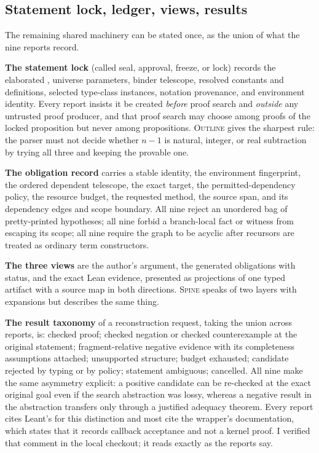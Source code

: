 \documentclass[11pt,a4paper]{article}
\newcommand{\code}[1]{\texttt{\detokenize{#1}}}
\newcommand{\Ou}{\textsc{Outline}}
\newcommand{\Sp}{\textsc{Spine}}
\theoremstyle{definition}
\begin{document}
\subsection{Statement lock, ledger, views, results}
The remaining shared machinery can be stated once, as the union of what the nine reports record.

\textbf{The statement lock} (called seal, approval, freeze, or lock) records the elaborated \code{Expr}, universe parameters, binder telescope, resolved constants and definitions, selected type-class instances, notation provenance, and environment identity. Every report insists it be created \emph{before} proof search and \emph{outside} any untrusted proof producer, and that proof search may choose among proofs of the locked proposition but never among propositions. \Ou{} gives the sharpest rule: the parser must not decide whether $n-1$ is natural, integer, or real subtraction by trying all three and keeping the provable one.

\textbf{The obligation record} carries a stable identity, the environment fingerprint, the ordered dependent telescope, the exact target, the permitted-dependency policy, the resource budget, the requested method, the source span, and its dependency edges and scope boundary. All nine reject an unordered bag of pretty-printed hypotheses; all nine forbid a branch-local fact or witness from escaping its scope; all nine require the graph to be acyclic after recursors are treated as ordinary term constructors.

\textbf{The three views} are the author's argument, the generated obligations with status, and the exact Lean evidence, presented as projections of one typed artifact with a source map in both directions. \Sp{} speaks of two layers with expansions but describes the same thing.

\textbf{The result taxonomy} of a reconstruction request, taking the union across reports, is: checked proof; checked negation or checked counterexample at the original statement; fragment-relative negative evidence with its completeness assumptions attached; unsupported structure; budget exhausted; candidate rejected by typing or by policy; statement ambiguous; cancelled. All nine make the same asymmetry explicit: a positive candidate can be re-checked at the exact original goal even if the search abstraction was lossy, whereas a negative result in the abstraction transfers only through a justified adequacy theorem. Every report cites Leant's \code{Fragment.hs} for this distinction and most cite the \code{Verified} wrapper's documentation, which states that it records callback acceptance and not a kernel proof. I verified that comment in the local checkout; it reads exactly as the reports say.
\end{document}
